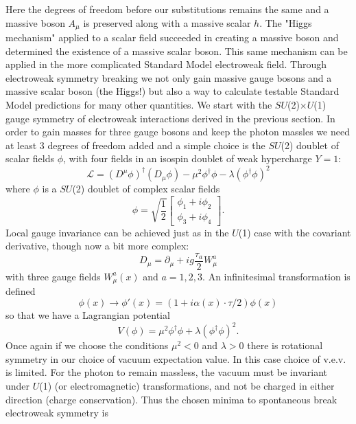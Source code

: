 Here the degrees of freedom before our substitutions remains the same and a massive boson $A_\mu$ is preserved along with a massive scalar $h$. The "Higgs mechanism" applied to a scalar field succeeded in creating a massive boson and determined the existence of a massive scalar boson. This same mechanism can be applied in the more complicated Standard Model electroweak field. Through electroweak symmetry breaking we not only gain massive gauge bosons and a massive scalar boson (the Higgs!) but also a way to calculate testable Standard Model predictions for many other quantities. We start with the $SU$(2)$\times$$U$(1) gauge symmetry of electroweak interactions derived in the previous section. In order to gain masses for three gauge bosons and keep the photon massles we need at least 3 degrees of freedom added and a simple choice is the $SU$(2) doublet of scalar fields $\phi$, with four fields in an isospin doublet of weak hypercharge $Y=1$: 
\begin{equation}
\mathcal{L} =(D^\mu \phi)^\dagger(D_\mu\phi)-\mu^2\phi^\dagger\phi-\lambda(\phi^\dagger\phi)^2
\end{equation}
where $\phi$ is a $SU$(2) doublet of complex scalar fields
\begin{equation}
\phi = \sqrt{\frac{1}{2}}\begin{bmatrix}
	\phi_1+i\phi_2  \\
	\phi_3+i\phi_4
	\end{bmatrix} .
\end{equation}
Local gauge invariance can be achieved just as in the $U$(1) case with the covariant derivative, though now a bit more complex:
\begin{equation}
D_\mu = \partial_\mu + ig \frac{\tau_a}{2}W_\mu^a
\end{equation}
with three gauge fields $W_\mu^a(x)$ and $a=1,2,3$. An infinitesimal transformation is defined
\begin{equation}
\phi(x)\rightarrow \phi'(x) = (1+i\alpha(x)\cdot\tau/2)\phi(x)
\end{equation}
so that we have a Lagrangian potential 
\begin{equation}
V(\phi) = \mu^2\phi^\dagger\phi+\lambda(\phi^\dagger\phi)^2.
\end{equation}
Once again if we choose the conditions $\mu^2<0$ and $\lambda>0$ there is rotational symmetry in our choice of vacuum expectation value. In this case choice of v.e.v. is limited. For the photon to remain massless, the vacuum must be invariant under $U$(1) (or electromagnetic) transformations, and not be charged in either direction (charge conservation). Thus the chosen minima to spontaneous break electroweak symmetry is
$$
